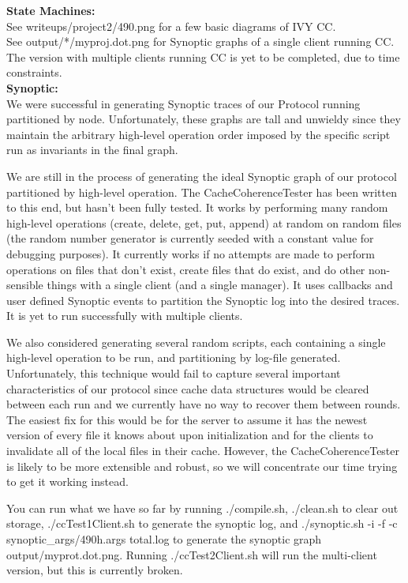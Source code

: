 \documentclass[11pt]{article}
\begin{document}
\textbf{State Machines:} \\

See writeups/project2/490.png for a few basic diagrams of IVY CC. \\
See output/*/myproj.dot.png for Synoptic graphs of a single client running CC. \\
The version with multiple clients running CC is yet to be completed, due to time constraints. \\

\textbf{Synoptic:} \\

We were successful in generating Synoptic traces of our Protocol running partitioned by node. Unfortunately, these graphs are tall and unwieldy since they
maintain the arbitrary high-level operation order imposed by the specific script run as invariants in the final graph.

We are still in the process of generating the ideal Synoptic graph of our protocol partitioned by high-level operation. The CacheCoherenceTester has been written to this end, but hasn't been fully tested.
It works by performing many random high-level operations (create, delete, get, put, append) at random on random files (the random number generator is currently seeded with a constant value for debugging purposes).
 It currently works if no attempts are made to perform operations on files that don't exist, create files that do exist, and do other non-sensible things with a single client (and a single manager).
It uses callbacks and user defined Synoptic events to partition the Synoptic log into the desired traces. It is yet to run successfully with multiple clients.

We also considered generating several random scripts, each containing a single high-level operation to be run, and partitioning by log-file generated. Unfortunately, this technique
would fail to capture several important characteristics of our protocol since cache data structures would be cleared between each run and we currently have no way to recover them between rounds.
The easiest fix for this would be for the server to assume it has the newest version of every file it knows about upon initialization and for the clients to invalidate all of the local files in their cache.
However, the CacheCoherenceTester is likely to be more extensible and robust, so we will concentrate our time trying to get it working instead.

You can run what we have so far by running ./compile.sh, ./clean.sh to clear out storage, ./ccTest1Client.sh to generate the synoptic log, and ./synoptic.sh -i -f -c synoptic\_args/490h.args total.log to generate the synoptic graph output/myprot.dot.png. Running ./ccTest2Client.sh will run the multi-client version, but this is currently broken. \\
\end{document}
